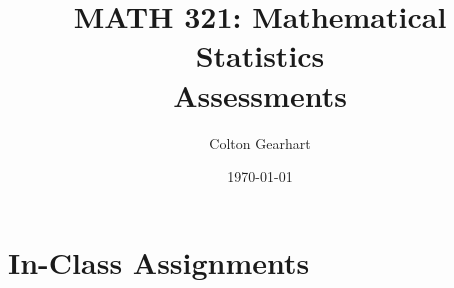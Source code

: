 \documentclass{article}
\title{MATH 321: Mathematical Statistics\\Assessments}
\author{Colton Gearhart}
\date{\today}
\begin{document}
\maketitle
\tableofcontents
\newpage

\section{In-Class Assignments\\}\newpage

%
%
%
%
%
%
%
%
%
%
%
%
%
\end{document}
